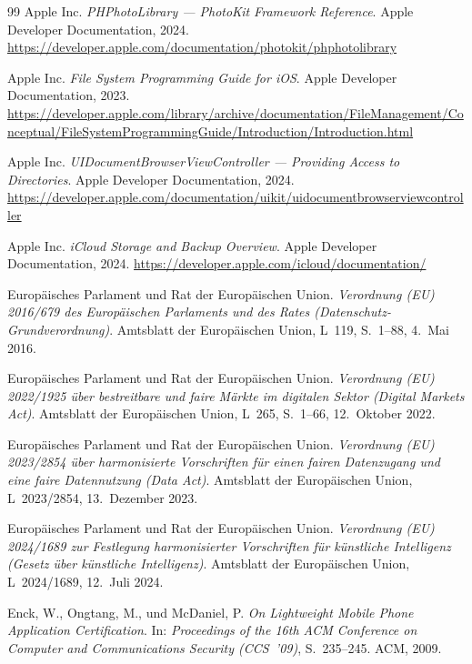 ﻿\documentclass[12pt, a4paper]{article}
\begin{document}
\begin{thebibliography}{99}
Apple Inc.
\newblock \emph{PHPhotoLibrary --- PhotoKit Framework Reference}.
\newblock Apple Developer Documentation, 2024.
\newblock \url{https://developer.apple.com/documentation/photokit/phphotolibrary}

Apple Inc.
\newblock \emph{File System Programming Guide for iOS}.
\newblock Apple Developer Documentation, 2023.
\newblock \url{https://developer.apple.com/library/archive/documentation/FileManagement/Conceptual/FileSystemProgrammingGuide/Introduction/Introduction.html}

Apple Inc.
\newblock \emph{UIDocumentBrowserViewController --- Providing Access to Directories}.
\newblock Apple Developer Documentation, 2024.
\newblock \url{https://developer.apple.com/documentation/uikit/uidocumentbrowserviewcontroller}

Apple Inc.
\newblock \emph{iCloud Storage and Backup Overview}.
\newblock Apple Developer Documentation, 2024.
\newblock \url{https://developer.apple.com/icloud/documentation/}

Europäisches Parlament und Rat der Europäischen Union.
\newblock \emph{Verordnung (EU) 2016/679 des Europäischen Parlaments und des Rates
  (Datenschutz-Grundverordnung)}.
\newblock Amtsblatt der Europäischen Union, L~119, S.~1--88, 4.~Mai 2016.

Europäisches Parlament und Rat der Europäischen Union.
\newblock \emph{Verordnung (EU) 2022/1925 über bestreitbare und faire Märkte im
  digitalen Sektor (Digital Markets Act)}.
\newblock Amtsblatt der Europäischen Union, L~265, S.~1--66, 12.~Oktober 2022.

Europäisches Parlament und Rat der Europäischen Union.
\newblock \emph{Verordnung (EU) 2023/2854 über harmonisierte Vorschriften für einen
  fairen Datenzugang und eine faire Datennutzung (Data Act)}.
\newblock Amtsblatt der Europäischen Union, L~2023/2854, 13.~Dezember 2023.

Europäisches Parlament und Rat der Europäischen Union.
\newblock \emph{Verordnung (EU) 2024/1689 zur Festlegung harmonisierter Vorschriften
  für künstliche Intelligenz (Gesetz über künstliche Intelligenz)}.
\newblock Amtsblatt der Europäischen Union, L~2024/1689, 12.~Juli 2024.

Enck, W., Ongtang, M., und McDaniel, P.
\newblock \emph{On Lightweight Mobile Phone Application Certification}.
\newblock In: \emph{Proceedings of the 16th ACM Conference on Computer and
  Communications Security (CCS~'09)}, S.~235--245. ACM, 2009.


\end{thebibliography}
\end{document}
